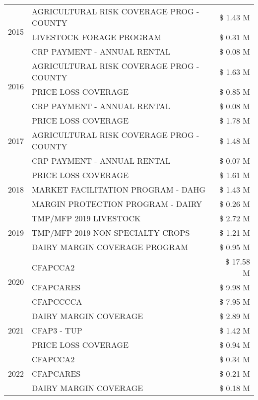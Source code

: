 \begin{tabular}{llr}
\cline{1-3}
\multirow[t]{3}{*}{2015} & AGRICULTURAL RISK COVERAGE PROG - COUNTY & \$ 1.43 M \\
 & LIVESTOCK FORAGE PROGRAM & \$ 0.31 M \\
 & CRP PAYMENT - ANNUAL RENTAL & \$ 0.08 M \\
\cline{1-3}
\multirow[t]{3}{*}{2016} & AGRICULTURAL RISK COVERAGE PROG - COUNTY & \$ 1.63 M \\
 & PRICE LOSS COVERAGE & \$ 0.85 M \\
 & CRP PAYMENT - ANNUAL RENTAL & \$ 0.08 M \\
\cline{1-3}
\multirow[t]{3}{*}{2017} & PRICE LOSS COVERAGE & \$ 1.78 M \\
 & AGRICULTURAL RISK COVERAGE PROG - COUNTY & \$ 1.48 M \\
 & CRP PAYMENT - ANNUAL RENTAL & \$ 0.07 M \\
\cline{1-3}
\multirow[t]{3}{*}{2018} & PRICE LOSS COVERAGE & \$ 1.61 M \\
 & MARKET FACILITATION PROGRAM - DAHG & \$ 1.43 M \\
 & MARGIN PROTECTION PROGRAM - DAIRY & \$ 0.26 M \\
\cline{1-3}
\multirow[t]{3}{*}{2019} & TMP/MFP 2019 LIVESTOCK & \$ 2.72 M \\
 & TMP/MFP 2019 NON SPECIALTY CROPS & \$ 1.21 M \\
 & DAIRY MARGIN COVERAGE PROGRAM & \$ 0.95 M \\
\cline{1-3}
\multirow[t]{3}{*}{2020} & CFAPCCA2 & \$ 17.58 M \\
 & CFAPCARES & \$ 9.98 M \\
 & CFAPCCCCA & \$ 7.95 M \\
\cline{1-3}
\multirow[t]{3}{*}{2021} & DAIRY MARGIN COVERAGE & \$ 2.89 M \\
 & CFAP3 - TUP & \$ 1.42 M \\
 & PRICE LOSS COVERAGE & \$ 0.94 M \\
\cline{1-3}
\multirow[t]{3}{*}{2022} & CFAPCCA2 & \$ 0.34 M \\
 & CFAPCARES & \$ 0.21 M \\
 & DAIRY MARGIN COVERAGE & \$ 0.18 M \\
\cline{1-3}
\bottomrule
\end{tabular}
